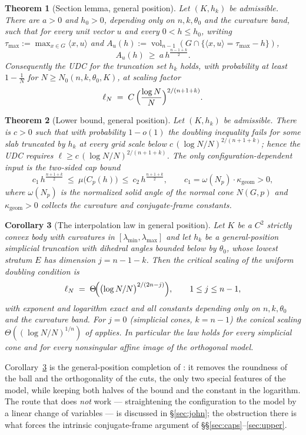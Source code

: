\documentclass[11pt]{article}
\newtheorem{theorem}{Theorem}[section]
\newtheorem{corollary}[theorem]{Corollary}
\theoremstyle{definition}
\theoremstyle{remark}
\newcommand{\vol}{\operatorname{vol}}
\begin{document}
\begin{theorem}[Section lemma, general position]\label{thm:A}
Let $(K,h_k)$ be admissible.  There are $a>0$ and $h_0>0$, depending only on
$n,k,\theta_0$ and the curvature band, such that for every unit vector $u$ and
every $0<h\le h_0$, writing $\tau_{\max}:=\max_{x\in G}\langle x,u\rangle$ and
$A_u(h):=\vol_{n-1}(G\cap\{\langle x,u\rangle=\tau_{\max}-h\})$,
\[
A_u(h)\ \ge\ a\,h^{\frac{n-1+k}2}.
\]
Consequently the UDC for the truncation set $h_k$ holds, with probability at
least $1-\frac1N$ for $N\ge N_0(n,k,\theta_0,K)$, at scaling factor
\[
\ell_N\;=\;C\,\Bigl(\frac{\log N}{N}\Bigr)^{2/(n+1+k)} .
\]
\end{theorem}

\begin{theorem}[Lower bound, general position]\label{thm:B}
Let $(K,h_k)$ be admissible.  There is $c>0$ such that with probability
$1-o(1)$ the doubling inequality fails for some slab truncated by $h_k$ at
every grid scale below $c\,(\log N/N)^{2/(n+1+k)}$; hence the UDC requires
$\ell\ge c\,(\log N/N)^{2/(n+1+k)}$.  The only configuration-dependent input
is the two-sided cap bound
\[
c_1\,h^{\frac{n+1+k}2}\ \le\ \mu\bigl(C_p(h)\bigr)\ \le\
c_2\,h^{\frac{n+1+k}2},
\qquad c_1=\omega(N_p)\cdot\kappa_{\mathrm{geom}}>0,
\]
where $\omega(N_p)$ is the normalized solid angle of the normal cone
$N(G,p)$ and $\kappa_{\mathrm{geom}}>0$ collects the curvature and
conjugate-frame constants.
\end{theorem}

\begin{corollary}[The interpolation law in general position]\label{cor:C}
Let $K$ be a $C^2$ strictly convex body with curvatures in
$[\lambda_{\min},\lambda_{\max}]$ and let $h_k$ be a general-position
simplicial truncation with dihedral angles bounded below by $\theta_0$, whose
lowest stratum $E$ has dimension $j=n-1-k$.  Then the critical scaling of the
uniform doubling condition is
\[
\ell_N\;=\;\Theta\!\Bigl(\bigl(\log N/N\bigr)^{2/(2n-j)}\Bigr),
\qquad 1\le j\le n-1,
\]
with exponent and logarithm exact and all constants depending only on
$n,k,\theta_0$ and the curvature band.  For $j=0$ (simplicial cones, $k=n-1$)
the conical scaling $\Theta((\log N/N)^{1/n})$ of \cite{companion3,companion5}
applies.  In particular the law holds for every simplicial cone and for every
nonsingular affine image of the orthogonal model.
\end{corollary}

Corollary~\ref{cor:C} is the general-position completion of
\cite[Theorem 1.1]{companion11}: it removes the roundness of the ball and the
orthogonality of the cuts, the only two special features of the model, while
keeping both halves of the bound and the constant in the logarithm.  The route
that does \emph{not} work --- straightening the configuration to the model by a
linear change of variables --- is discussed in \S\ref{sec:john}; the obstruction
there is what forces the intrinsic conjugate-frame argument of
\S\S\ref{sec:caps}--\ref{sec:upper}.
\end{document}
